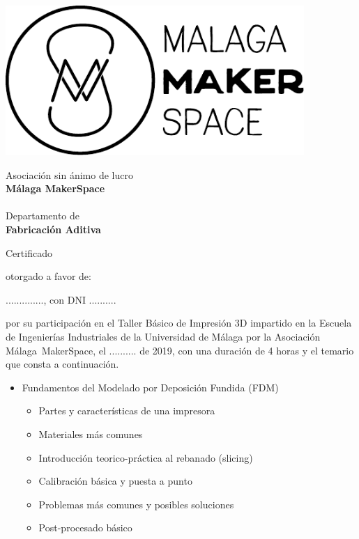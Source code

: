 \documentclass{scrartcl}
\begin{document}
	\pagestyle{empty}
	\hspace*{-20pt}
	\noindent
	\begin{minipage}[l]{7cm}
		\includegraphics[width=0.85\textwidth]{logo}
	\end{minipage}
	\hfill
	\begin{minipage}{6cm}
		\begin{mdframed}[topline=false, rightline=false, bottomline=false, linewidth=2pt]
			Asociación sin ánimo de lucro\\
			\textbf{Málaga MakerSpace}
			\\\\
			Departamento de\\
			\textbf{Fabricación Aditiva}
		\end{mdframed}
	\end{minipage}
	
\vspace{2cm}

	\noindent
	\begin{center}
		\huge
		Certificado
	\end{center}
	
	\vspace{1cm}
	\noindent
	otorgado a favor de:
	
	\bigskip
	.............., con DNI ..........
	
	\bigskip
	\noindent
	por su participación en el Taller Básico de Impresión 3D impartido en la Escuela de Ingenierías Industriales de la Universidad de Málaga por la Asociación \mbox{Málaga MakerSpace}, el .......... de 2019, con una duración de 4 horas y el temario que consta a continuación.
	
	\bigskip
	\begin{itemize}
		\item Fundamentos del Modelado por Deposición Fundida (FDM)
		\begin{itemize}
			\item Partes y características de una impresora
			\item Materiales más comunes
			\item Introducción teorico-práctica al rebanado (slicing)
			\item Calibración básica y puesta a punto
			\item Problemas más comunes y posibles soluciones
			\item Post-procesado básico
		\end{itemize}
	\end{itemize}
	
\end{document}
